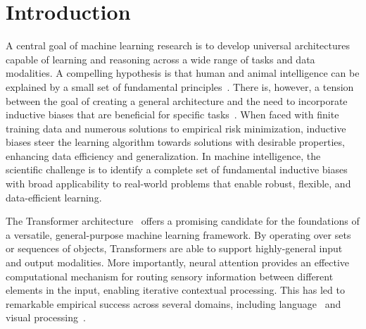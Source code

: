 \section{Introduction}\label{sec:intro}

A central goal of machine learning research is to develop universal architectures capable of learning and reasoning across a wide range of tasks and data modalities. A compelling hypothesis is that human and animal intelligence can be explained by a small set of fundamental principles~\citep{marcus2003algebraic}. There is, however, a tension between the goal of creating a general architecture and the need to incorporate inductive biases that are beneficial for specific tasks~\citep{wolpert1995no,baxter2000model}. When faced with finite training data and numerous solutions to empirical risk minimization, inductive biases steer the learning algorithm towards solutions with desirable properties, enhancing data efficiency and generalization.
In machine intelligence, the scientific challenge is to identify a complete set of fundamental inductive biases with broad applicability to real-world problems that enable robust, flexible, and data-efficient learning.

The Transformer architecture~\citep{vaswani2017attention} offers a promising candidate for the foundations of a versatile, general-purpose machine learning framework. By operating over sets or sequences of objects, Transformers are able to support highly-general input and output modalities. More importantly, neural attention provides an effective computational mechanism for routing sensory information between different elements in the input, enabling iterative contextual processing. This has led to remarkable empirical success across several domains, including language~\citep{radfordImprovingLanguageUnderstanding2018,devlinBERTPretrainingDeep2019,radford2019language,kaplan2020scalinglawsneurallanguage,brown2020languagemodelsfewshotlearners} and visual processing~\citep{dosovitskiyImageWorth16x162020,carion2020end,zhai2022scaling}.

 
